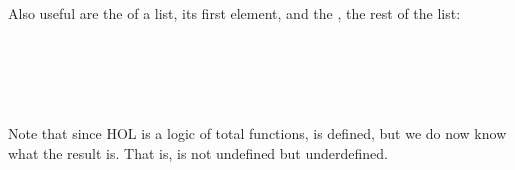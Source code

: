 \begin{isabellebody}
\begin{isamarkuptext}
\begin{isabelle}
\end{isabelle}
Also useful are the  of a list, its first element,
and the , the rest of the list:
\begin{isabelle}
 \\
\end{isabelle}
\begin{isabelle}
 \\
 \\
\end{isabelle}
Note that since HOL is a logic of total functions,  is defined,
but we do now know what the result is. That is,  is not undefined
but underdefined.%
\end{isamarkuptext}%
\isamarkuptrue%
%
\isadelimtheory
%
\endisadelimtheory
%
\isatagtheory
%
\endisatagtheory
{\isafoldtheory}%
%
\isadelimtheory
%
\endisadelimtheory
\end{isabellebody}%
